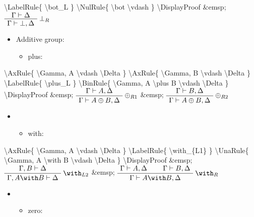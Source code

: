 \textbackslash{}LabelRule\{ \textbackslash{}bot\_L \}
\textbackslash{}NulRule\{ \textbackslash{}bot \textbackslash{}vdash \}
\textbackslash{}DisplayProof \&emsp; \(\AxRule{ \Gamma \vdash \Delta }
\LabelRule{ \bot_R }
\UnaRule{ \Gamma \vdash \bot, \Delta }
\DisplayProof\)

\begin{itemize}
\tightlist
\item
  Additive group:

  \begin{itemize}
  \tightlist
  \item
    plus: 
  \end{itemize}
\end{itemize}

\textbackslash{}AxRule\{ \textbackslash{}Gamma, A \textbackslash{}vdash
\textbackslash{}Delta \} \textbackslash{}AxRule\{ \textbackslash{}Gamma,
B \textbackslash{}vdash \textbackslash{}Delta \}
\textbackslash{}LabelRule\{ \textbackslash{}plus\_L \}
\textbackslash{}BinRule\{ \textbackslash{}Gamma, A \textbackslash{}plus
B \textbackslash{}vdash \textbackslash{}Delta \}
\textbackslash{}DisplayProof \&emsp;
\(\AxRule{ \Gamma \vdash A, \Delta }
\LabelRule{ \plus_{R1} }
\UnaRule{ \Gamma \vdash A \plus B, \Delta }
\DisplayProof\) \&emsp; \(\AxRule{ \Gamma \vdash B, \Delta }
\LabelRule{ \plus_{R2} }
\UnaRule{ \Gamma \vdash A \plus B, \Delta }
\DisplayProof\)

\begin{itemize}
\item
  \begin{itemize}
  \tightlist
  \item
    with: 
  \end{itemize}
\end{itemize}

\textbackslash{}AxRule\{ \textbackslash{}Gamma, A \textbackslash{}vdash
\textbackslash{}Delta \} \textbackslash{}LabelRule\{
\textbackslash{}with\_\{L1\} \} \textbackslash{}UnaRule\{
\textbackslash{}Gamma, A \textbackslash{}with B \textbackslash{}vdash
\textbackslash{}Delta \} \textbackslash{}DisplayProof \&emsp;
\(\AxRule{ \Gamma, B \vdash \Delta }
\LabelRule{ \with_{L2} }
\UnaRule{ \Gamma, A \with B \vdash \Delta }
\DisplayProof\) \&emsp; \(\AxRule{ \Gamma \vdash A, \Delta }
\AxRule{ \Gamma \vdash B, \Delta }
\LabelRule{ \with_R }
\BinRule{ \Gamma \vdash A \with B, \Delta }
\DisplayProof\)

\begin{itemize}
\item
  \begin{itemize}
  \tightlist
  \item
    zero: 
  \end{itemize}
\end{itemize}

